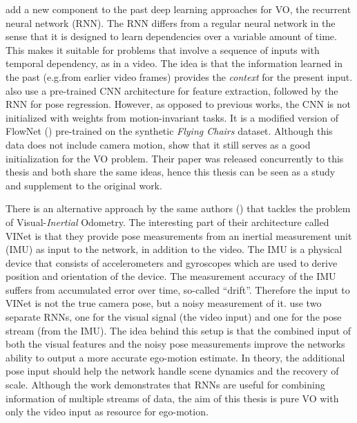 			\cite{wang2017deepvo} add a new component to the past deep learning approaches for VO, the recurrent neural network (RNN).
			The RNN differs from a regular neural network in the sense that it is designed to learn dependencies over a variable amount of time.
			This makes it suitable for problems that involve a sequence of inputs with temporal dependency, as in a video.
			The idea is that the information learned in the past (e.g.\@ from earlier video frames) provides the \emph{context} for the present input.
			\citeauthor{wang2017deepvo} also use a pre-trained CNN architecture for feature extraction, followed by the RNN for pose regression.
			However, as opposed to previous works, the CNN is not initialized with weights from motion-invariant tasks. 
			It is a modified version of FlowNet (\cite{dosovitskiy2015flownet}) pre-trained on the synthetic \emph{Flying Chairs} dataset.
			Although this data does not include camera motion, \citeauthor{wang2017deepvo} show that it still serves as a good initialization for the VO problem.
			Their paper was released concurrently to this thesis and both share the same ideas, hence this thesis can be seen as a study and supplement to the original work.
			
			There is an alternative approach by the same authors (\cite{clark2017vinet}) that tackles the problem of Visual-\emph{Inertial} Odometry.
			The interesting part of their architecture called VINet is that they provide pose measurements from an inertial measurement unit (IMU) as input to the network, in addition to the video.
			The IMU is a physical device that consists of accelerometers and gyroscopes which are used to derive position and orientation of the device.
			The measurement accuracy of the IMU suffers from accumulated error over time, so-called ``drift''.
			Therefore the input to VINet is not the true camera pose, but a noisy measurement of it.
			\citeauthor{clark2017vinet} use two separate RNNs, one for the visual signal (the video input) and one for the pose stream (from the IMU).
			The idea behind this setup is that the combined input of both the visual features and the noisy pose measurements improve the networks ability to output a more accurate ego-motion estimate.
			In theory, the additional pose input should help the network handle scene dynamics and the recovery of scale.
			Although the work demonstrates that RNNs are useful for combining information of multiple streams of data, the aim of this thesis is pure VO with only the video input as resource for ego-motion.
			
